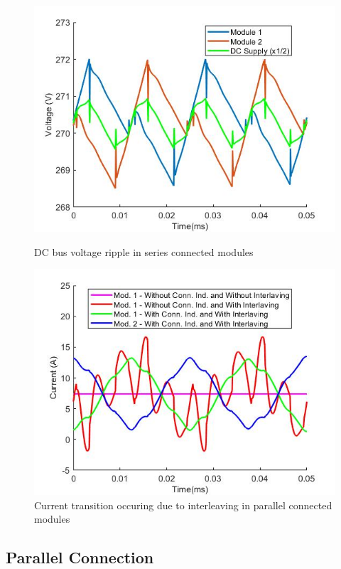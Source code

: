 \begin{figure}[tb]
  \includegraphics[width=\linewidth]{figures/series_volt_ripple.jpg}
  \caption{DC bus voltage ripple in series connected modules}\label{fig:series_volt_ripple}
\endminipage\hfill
{}
  \includegraphics[width=\linewidth]{figures/parallel_current_trans.jpg}
  \caption{Current transition occuring due to interleaving in parallel connected modules}\label{fig:parallel_current_trans}
\endminipage
\end{figure}

\subsection{Parallel Connection}

